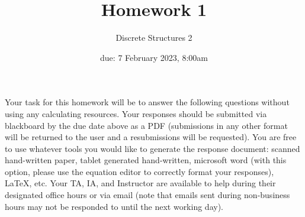 \documentclass[11pt, oneside]{article}   	%
\title{Homework 1}
\author{Discrete Structures 2}
\date{due: 7 February 2023, 8:00am}							%
\begin{document}
\maketitle

Your task for this homework will be to answer the following questions without using any calculating resources. 
Your responses should be submitted via blackboard by the due date above as a PDF (submissions in any other format will be returned to the user and a resubmissions will be requested). 
You are free to use whatever tools you would like to generate the response document: 
scanned hand-written paper, 
tablet generated hand-written, 
microsoft word (with this option, please use the equation editor to correctly format your responses), 
\LaTeX, etc.
Your TA, IA, and Instructor are available to help during their designated office hours or via email 
(note that emails sent during non-business hours may not be responded to until the next working day). 
\end{document}

